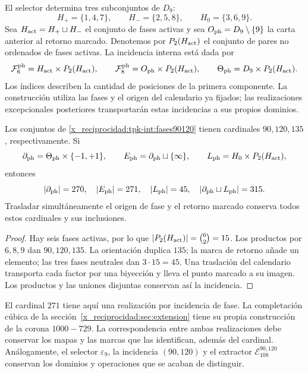 El selector determina tres subconjuntos de \(D_9\):
\[
 H_+=\{1,4,7\},\qquad H_-=\{2,5,8\},\qquad H_0=\{3,6,9\}.
\]
Sea \(H_{\rm act}=H_+\sqcup H_-\) el conjunto de fases activas y
sea \(O_{\rm ph}=D_9\setminus\{9\}\) la carta anterior al retorno
marcado. Denotemos por \(P_2(H_{\rm act})\) el conjunto de pares
no ordenados de fases activas. La incidencia interna está dada por
\begin{equation}
 \mathcal F^{\rm ph}_6=H_{\rm act}\times P_2(H_{\rm act}),\qquad
 \mathcal F^{\rm ph}_8=O_{\rm ph}\times P_2(H_{\rm act}),\qquad
 \Theta_{\rm ph}=D_9\times P_2(H_{\rm act}).
 \label{x_reciprocidad:tpk-int:fases90120}
\end{equation}
Los índices describen la cantidad de posiciones de la primera componente.
La construcción utiliza las fases y el origen del calendario ya fijados;
las realizaciones excepcionales posteriores transportarán estas
incidencias a sus propios dominios.

\begin{proposition}
\label{x_reciprocidad:tpk-int:cardinales}
Los conjuntos de \eqref{x_reciprocidad:tpk-int:fases90120} tienen cardinales
\(90,120,135\), respectivamente. Si
\[
 \partial_{\rm ph}=\Theta_{\rm ph}\times\{-1,+1\},\qquad
 E_{\rm ph}=\partial_{\rm ph}\sqcup\{\infty\},\qquad
 L_{\rm ph}=H_0\times P_2(H_{\rm act}),
\]
entonces
\[
 |\partial_{\rm ph}|=270,\quad |E_{\rm ph}|=271,\quad
 |L_{\rm ph}|=45,\quad
 |\partial_{\rm ph}\sqcup L_{\rm ph}|=315.
\]
Trasladar simultáneamente el origen de fase y el retorno marcado conserva
todos estos cardinales y sus inclusiones.
\end{proposition}
\begin{proof}
Hay seis fases activas, por lo que
\(|P_2(H_{\rm act})|=\binom62=15\). Los productos por
\(6,8,9\) dan \(90,120,135\). La orientación duplica \(135\);
la marca de retorno añade un elemento; las tres fases neutrales dan
\(3\cdot15=45\). Una traslación del calendario transporta cada
factor por una biyección y lleva el punto marcado a su imagen. Los
productos y las uniones disjuntas conservan así la incidencia.
\end{proof}

El cardinal \(271\) tiene aquí una realización por incidencia de
fase. La completación cúbica de la sección~\ref{x_reciprocidad:sec:extension} tiene
su propia construcción de la corona \(1000-729\). La correspondencia
entre ambas realizaciones debe conservar los mapas y las marcas que las
identifican, además del cardinal. Análogamente, el selector
\(\varepsilon_9\), la incidencia \((90,120)\) y el extractor
\(\mathcal E_{108}^{90,120}\) conservan los dominios y operaciones
que se acaban de distinguir.

